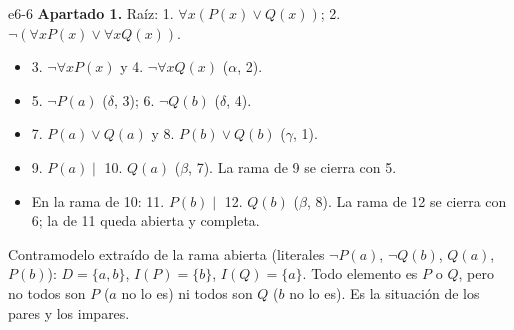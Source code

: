 \begin{solucion}{e6-6}
\textbf{Apartado 1.} Raíz: 1. $\forall x (P(x) \lor Q(x))$; 2. $\neg(\forall x P(x) \lor \forall x Q(x))$.
\begin{itemize}
    \item 3. $\neg \forall x P(x)$ y 4. $\neg \forall x Q(x)$ ($\alpha$, 2).
    \item 5. $\neg P(a)$ ($\delta$, 3); 6. $\neg Q(b)$ ($\delta$, 4).
    \item 7. $P(a) \lor Q(a)$ y 8. $P(b) \lor Q(b)$ ($\gamma$, 1).
    \item 9. $P(a) \mid$ 10. $Q(a)$ ($\beta$, 7). La rama de 9 se cierra con 5.
    \item En la rama de 10: 11. $P(b) \mid$ 12. $Q(b)$ ($\beta$, 8). La rama de 12 se cierra con 6; la de 11 queda abierta y completa.
\end{itemize}
Contramodelo extraído de la rama abierta (literales $\neg P(a)$, $\neg Q(b)$, $Q(a)$, $P(b)$): $D = \{a, b\}$, $I(P) = \{b\}$, $I(Q) = \{a\}$. Todo elemento es $P$ o $Q$, pero no todos son $P$ ($a$ no lo es) ni todos son $Q$ ($b$ no lo es). Es la situación de los pares y los impares.
\end{solucion}

